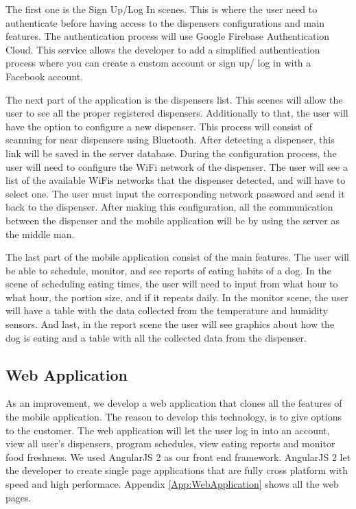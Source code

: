 \documentclass[12pt]{article}
\begin{document}
The first one is the Sign Up/Log In scenes. This is where the user need to authenticate before having access to the dispensers configurations and main features. The authentication process will use Google Firebase Authentication Cloud. This service allows the developer to add a simplified authentication process where you can create a custom account or sign up/ log in with a Facebook account.

The next part of the application is the dispensers list. This scenes will allow the user to see all the proper registered dispensers. Additionally to that, the user will have the option to configure a new dispenser. This process will consist of scanning for near dispensers using Bluetooth. After detecting a dispenser, this link will be saved in the server database. During the configuration process, the user will need to configure the  WiFi network of the dispenser. The user will see a list of the available WiFis networks that the dispenser detected, and will have to select one. The user must input the corresponding network password and send it back to the dispenser. After making this configuration, all the communication between the dispenser and the mobile application will be by using the server as the middle man.

The last part of the mobile application consist of the main features. The user will be able to schedule, monitor, and see reports of eating habits of a dog. In the scene of scheduling eating times, the user will need to input from what hour to what hour, the portion size, and if it repeats daily. In the monitor scene, the user will have a table with the data collected from the temperature and humidity sensors. And last, in the report scene the user will see graphics about how the dog is eating and a table with all the collected data from the dispenser.

\subsection{Web Application}

As an improvement, we develop a web application that clones all the features of the mobile application. The reason to develop this technology, is to give options to the customer. The web application will let the user log in into an account, view all user's dispensers, program schedules, view eating reports and monitor food freshness. We used AngularJS 2 as our front end framework. AngularJS 2 let the developer to create single page applications that are fully cross platform with speed and high performace. Appendix \ref{App:WebApplication} shows all the web pages.
\end{document}
